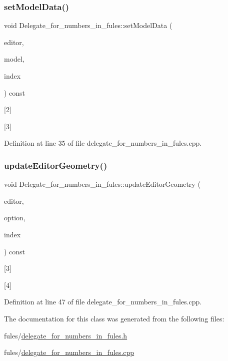 \subsubsection{\texorpdfstring{set\+Model\+Data()}{setModelData()}}
{\footnotesize\ttfamily void Delegate\+\_\+for\+\_\+numbers\+\_\+in\+\_\+fules\+::set\+Model\+Data (\begin{DoxyParamCaption}\item[{Q\+Widget $\ast$}]{editor,  }\item[{Q\+Abstract\+Item\+Model $\ast$}]{model,  }\item[{const Q\+Model\+Index \&}]{index }\end{DoxyParamCaption}) const}



\mbox{[}2\mbox{]} 

\mbox{[}3\mbox{]} 

Definition at line 35 of file delegate\+\_\+for\+\_\+numbers\+\_\+in\+\_\+fules.\+cpp.

\mbox{\label{classDelegate__for__numbers__in__fules_a2c2d5f81ed07f0992f692e6858d13aaf}} 
\subsubsection{\texorpdfstring{update\+Editor\+Geometry()}{updateEditorGeometry()}}
{\footnotesize\ttfamily void Delegate\+\_\+for\+\_\+numbers\+\_\+in\+\_\+fules\+::update\+Editor\+Geometry (\begin{DoxyParamCaption}\item[{Q\+Widget $\ast$}]{editor,  }\item[{const Q\+Style\+Option\+View\+Item \&}]{option,  }\item[{const Q\+Model\+Index \&}]{index }\end{DoxyParamCaption}) const}



\mbox{[}3\mbox{]} 

\mbox{[}4\mbox{]} 

Definition at line 47 of file delegate\+\_\+for\+\_\+numbers\+\_\+in\+\_\+fules.\+cpp.



The documentation for this class was generated from the following files\+:\begin{DoxyCompactItemize}
\item 
fules/\hyperlink{delegate__for__numbers__in__fules_8h}{delegate\+\_\+for\+\_\+numbers\+\_\+in\+\_\+fules.\+h}\item 
fules/\hyperlink{delegate__for__numbers__in__fules_8cpp}{delegate\+\_\+for\+\_\+numbers\+\_\+in\+\_\+fules.\+cpp}\end{DoxyCompactItemize}
